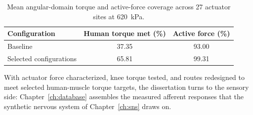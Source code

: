 \begin{table}[htbp]
\centering
\caption{Mean angular-domain torque and active-force coverage across 27 actuator sites at \qty{620}{\kPa}.}
\label{tab:CapabilitySurvey}
\begin{tabular}{@{}lcc@{}}
\toprule
\textbf{Configuration} & \textbf{Human torque met (\%)} & \textbf{Active force (\%)} \\
\midrule
Baseline & 37.35 & 93.00 \\
Selected configurations & 65.81 & 99.31 \\
\bottomrule
\end{tabular}
\end{table}

With actuator force characterized, knee torque tested, and routes redesigned to meet selected human-muscle torque targets, the dissertation turns to the sensory side: Chapter~\ref{ch:database} assembles the measured afferent responses that the synthetic nervous system of Chapter~\ref{ch:sns} draws on.
